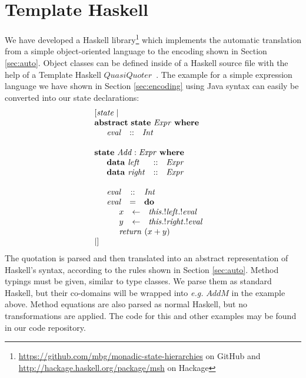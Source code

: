 \section{Template Haskell}
\label{sec:th}

We have developed a Haskell library\footnote{\url{https://github.com/mbg/monadic-state-hierarchies} on GitHub and \url{http://hackage.haskell.org/package/msh} on Hackage} which implements the automatic translation from a simple object-oriented language to the encoding shown in Section \ref{sec:auto}. Object classes can be defined inside of a Haskell source file with the help of a Template Haskell $\mathit{QuasiQuoter}$~\cite{mainland2007s}. The example for a simple expression language we have shown in Section \ref{sec:encoding} using Java syntax can easily be converted into our state declarations:
\begin{displaymath}
\begin{array}{l}
[\mathit{state}\mid\\\mathbf{abstract}~\mathbf{state}~\mathit{Expr}~\mathbf{where} \\
\quad \begin{array}{lcl}
\mathit{eval} & :: & \mathit{Int}\\
\end{array}\\\\
\mathbf{state}~\mathit{Add} : \mathit{Expr}~\mathbf{where} \\
\quad \begin{array}{lcl}
\mathbf{data}~\mathit{left} & :: & \mathit{Expr} \\
\mathbf{data}~\mathit{right}  & :: & \mathit{Expr}
\end{array}\\\\
\quad \begin{array}{lcl}
\mathit{eval} & :: & \mathit{Int}\\
\mathit{eval} & = & \mathbf{do} \\
\multicolumn{3}{l}{\quad  \begin{array}{lcl}
x & \leftarrow & \mathit{this}.!\mathit{left}.!\mathit{eval}\\
y & \leftarrow & \mathit{this}.!\mathit{right}.!\mathit{eval}\\
\multicolumn{3}{l}{\mathit{return}~(x + y) }
\end{array}} 
\end{array}\\
\mid]
\end{array}
\end{displaymath}
The quotation is parsed and then translated into an abstract representation of Haskell's syntax, according to the rules shown in Section \ref{sec:auto}. Method typings must be given, similar to type classes. We parse them as standard Haskell, but their co-domains will be wrapped into \emph{e.g.} $\mathit{AddM}$ in the example above. Method equations are also parsed as normal Haskell, but no transformations are applied. The code for this and other examples may be found in our code repository.

